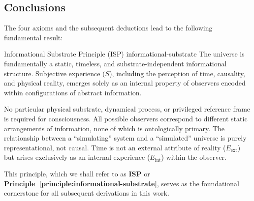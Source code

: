 \subsection*{Conclusions}

The four axioms and the subsequent deductions lead to the following fundamental result:

\begin{principle}{Informational Substrate Principle (ISP)}
{informational-substrate}
The universe is fundamentally a static, timeless, and substrate-independent informational structure.
Subjective experience ($S$), including the perception of time, causality, and physical reality, emerges solely as an internal property of observers encoded within configurations of abstract information. 

No particular physical substrate, dynamical process, or privileged reference frame is required for consciousness. All possible observers correspond to different static arrangements of information, none of which is ontologically primary. The relationship between a ``simulating'' system and a ``simulated'' universe is purely representational, not causal. Time is not an external attribute of reality ($E_{\text{ext}}$) but arises exclusively as an internal experience ($E_{\text{int}}$) within the observer.
\end{principle}

This principle, which we shall refer to as \textbf{ISP} or \textbf{Principle~\ref{principle:informational-substrate}}, serves as the foundational cornerstone for all subsequent derivations in this work.
